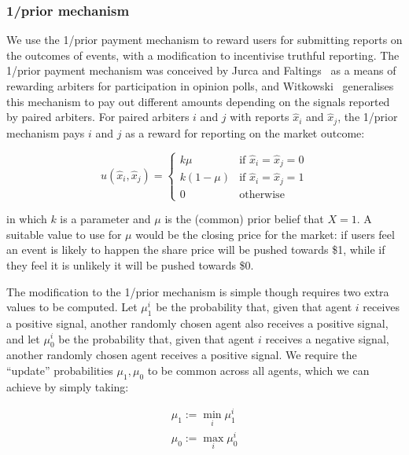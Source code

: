 \documentclass[10pt,a4paper]{article}
\theoremstyle{plain}
\theoremstyle{definition}
\begin{document}
\subsubsection{1/prior mechanism}

\label{sec:oneOverPrior}

We use the 1/prior payment mechanism to reward users for submitting reports on
the outcomes of events, with a modification to incentivise truthful reporting.
The 1/prior payment mechanism was conceived by Jurca and
Faltings~\cite{JurcaFaltings2008, JurcaFaltings2011} as a means of rewarding
arbiters for participation in opinion polls, and Witkowski~\cite{Witkowski2014}
generalises this mechanism to pay out different amounts depending on the
signals reported by paired arbiters. For paired arbiters $i$ and $j$ with
reports $\hat{x}_i$ and $\hat{x}_j$, the 1/prior mechanism pays $i$ and $j$ as
a reward for reporting on the market outcome:

\begin{equation}
	\label{eq:oneOverPrior}
	u(\hat{x}_i, \hat{x}_j) =
	\begin{cases}
		k \mu & \text{if } \hat{x}_i = \hat{x}_j = 0 \\
		k (1-\mu) & \text{if } \hat{x}_i = \hat{x}_j = 1 \\
		0 & \text{otherwise}
	\end{cases}
\end{equation}

in which $k$ is a parameter and $\mu$ is the (common) prior belief that $X=1$.
A suitable value to use for $\mu$ would be the closing price for the market: if
users feel an event is likely to happen the share price will be pushed towards
\$1, while if they feel it is unlikely it will be pushed towards \$0.

The modification to the 1/prior mechanism is simple though requires two extra
values to be computed. Let $\mu_1^i$ be the probability that, given that agent
$i$ receives a positive signal, another randomly chosen agent also receives a
positive signal, and let $\mu_0^i$ be the probability that, given that agent
$i$ receives a negative signal, another randomly chosen agent receives a
positive signal. We require the ``update'' probabilities $\mu_1, \mu_0$ to be
common across all agents, which we can achieve by simply taking:

\begin{equation}
	\begin{gathered}
		\mu_1 := \min_i \mu_1^i \\
		\mu_0 := \max_i \mu_0^i
	\end{gathered}
\end{equation}
\end{document}
